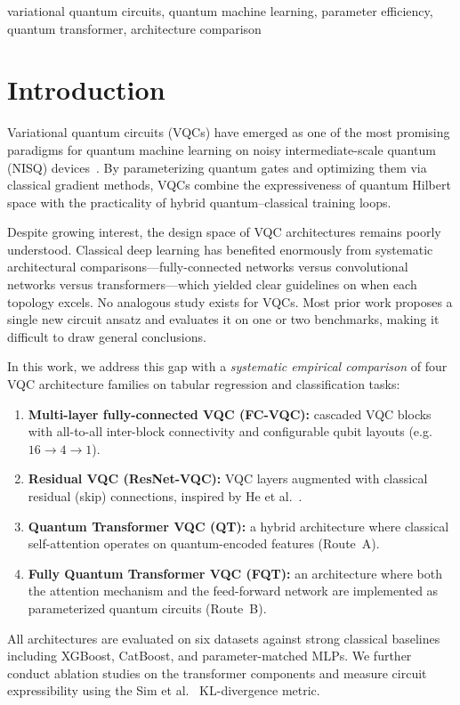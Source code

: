 \documentclass[10pt,conference]{IEEEtran}
\begin{document}
\begin{IEEEkeywords}
variational quantum circuits, quantum machine learning, parameter efficiency, quantum transformer, architecture comparison
\end{IEEEkeywords}

\section{Introduction}
\label{sec:intro}

Variational quantum circuits (VQCs) have emerged as one of the most promising paradigms for quantum machine learning on noisy intermediate-scale quantum (NISQ) devices~\cite{cerezo2021variational, benedetti2019parameterized}.
By parameterizing quantum gates and optimizing them via classical gradient methods, VQCs combine the expressiveness of quantum Hilbert space with the practicality of hybrid quantum--classical training loops.

Despite growing interest, the design space of VQC architectures remains poorly understood.
Classical deep learning has benefited enormously from systematic architectural comparisons---fully-connected networks versus convolutional networks versus transformers---which yielded clear guidelines on when each topology excels.
No analogous study exists for VQCs.
Most prior work proposes a single new circuit ansatz and evaluates it on one or two benchmarks, making it difficult to draw general conclusions.

In this work, we address this gap with a \emph{systematic empirical comparison} of four VQC architecture families on tabular regression and classification tasks:
\begin{enumerate}[leftmargin=*]
    \item \textbf{Multi-layer fully-connected VQC (FC-VQC):} cascaded VQC blocks with all-to-all inter-block connectivity and configurable qubit layouts (e.g.\ $16 \!\to\! 4 \!\to\! 1$).
    \item \textbf{Residual VQC (ResNet-VQC):} VQC layers augmented with classical residual (skip) connections, inspired by He et al.~\cite{he2016deep}.
    \item \textbf{Quantum Transformer VQC (QT):} a hybrid architecture where classical self-attention operates on quantum-encoded features (Route~A).
    \item \textbf{Fully Quantum Transformer VQC (FQT):} an architecture where both the attention mechanism and the feed-forward network are implemented as parameterized quantum circuits (Route~B).
\end{enumerate}
All architectures are evaluated on six datasets against strong classical baselines including XGBoost, CatBoost, and parameter-matched MLPs.
We further conduct ablation studies on the transformer components and measure circuit expressibility using the Sim et al.~\cite{sim2019expressibility} KL-divergence metric.
\end{document}
